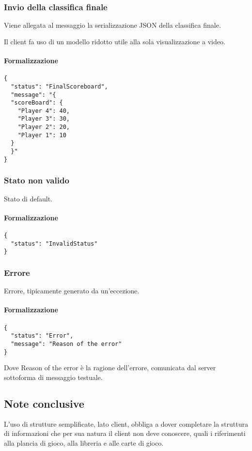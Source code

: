 \documentclass[a4paper,11pt]{article} %
\begin{document}
    \subsubsection{Invio della classifica finale}
    Viene allegata al messaggio la serializzazione JSON della classifica finale.

    Il client fa uso di un modello ridotto utile alla sola visualizzazione a video.

    \paragraph{Formalizzazione}
    \begin{verbatim}
{
  "status": "FinalScoreboard",
  "message": "{
  "scoreBoard": {
    "Player 4": 40,
    "Player 3": 30,
    "Player 2": 20,
    "Player 1": 10
  }
  }"
}
    \end{verbatim}

    \newpage

    \subsubsection{Stato non valido}
    Stato di default.

    \paragraph{Formalizzazione}
    \begin{verbatim}
{
  "status": "InvalidStatus"
}
    \end{verbatim}

    \subsubsection{Errore}
    Errore, tipicamente generato da un'eccezione.

    \paragraph{Formalizzazione}
    \begin{verbatim}
{
  "status": "Error",
  "message": "Reason of the error"
}
    \end{verbatim}
    Dove \textsf{Reason of the error} è la ragione dell'errore, comunicata dal server sottoforma di messaggio testuale.

    \subsection{Note conclusive}\label{subsec:note-conclusive}
    L'uso di strutture semplificate, lato client, obbliga a dover completare la struttura di informazioni che per sua natura il client non deve conoscere,
    quali i riferimenti alla plancia di gioco, alla libreria e alle carte di gioco.
\end{document}
